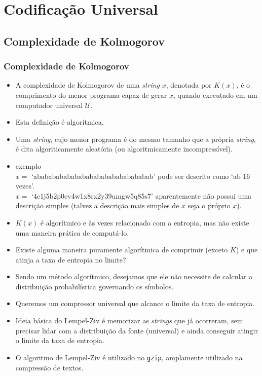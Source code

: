 \section{Codificação Universal}

\subsection{Complexidade de Kolmogorov}

\begin{frame}[allowframebreaks]
  \frametitle{Complexidade de Kolmogorov}

  \begin{itemize}
  \item A complexidade de Kolmogorov de uma \textit{string} $x$, 
	denotada por $K(x)$, é o comprimento
	do menor programa capaz de gerar $x$, quando executado em um
	computador universal $\mathcal{U}$.
  \item Esta definição é algorítmica.
  \item Uma \textit{string}, cujo menor programa é do mesmo tamanho que
	a própria \textit{string}, é dita algoriticamente aleatória
	(ou algoritmicamente incompressível).
  \item exemplo \\
	$x =$ `abababababababababababababababab' pode ser descrito
	como `ab 16 vezes'. \\
	$x =$ `4c1j5b2p0cv4w1x8rx2y39umgw5q85s7' aparentemente não
	possui uma descrição simples (talvez a descrição mais 
	simples de $x$ seja o próprio $x$). 
  \item $K(x)$ é algorítmico e às vezes relacionado com a entropia, mas
	não existe uma maneira prática de computá-lo.
  \item Existe alguma maneira puramente algorítmica de comprimir 
	(exceto $K$) e que atinja a taxa de entropia no limite?
  \item Sendo um método algorítmico, desejamos que ele não necessite
	de calcular a distribuição probabilística governando os símbolos.
  \item Queremos um compressor universal que alcance o limite da taxa de entropia.
  \item Ideia básica do Lempel-Ziv é memorizar as \textit{strings} que já
	ocorreram, sem precisar lidar com a distribuição da fonte (universal) e ainda
	conseguir atingir o limite da taxa de entropia.
  \item O algoritmo de Lempel-Ziv é utilizado no \texttt{gzip}, amplamente utilizado
	na compressão de textos.
  \end{itemize}
\end{frame}


